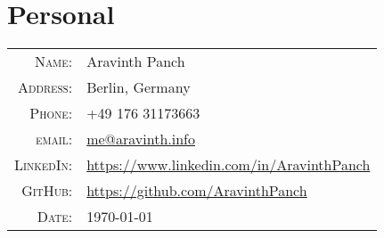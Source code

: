 \section{Personal}
\begin{tabular}
	{rl}
	\textsc{Name:} &  Aravinth Panch \\
	\textsc{Address:} & Berlin, Germany\\
	\textsc{Phone:} & +49 176 31173663\\
	\textsc{email:} & \href{mailto:me@aravinth.info}{me@aravinth.info} \\
	\textsc{LinkedIn:} & \href{https://www.linkedin.com/in/AravinthPanch}{https://www.linkedin.com/in/AravinthPanch} \\
	\textsc{GitHub:} & \href{https://github.com/AravinthPanch}{https://github.com/AravinthPanch} \\
	\textsc{Date:} & \today\\
\end{tabular}
